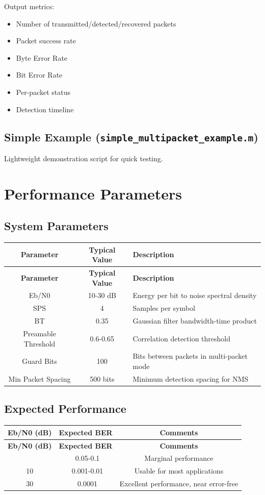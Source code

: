 \documentclass[12pt]{article}
\begin{document}
Output metrics:
\begin{itemize}
    \item Number of transmitted/detected/recovered packets
    \item Packet success rate
    \item Byte Error Rate
    \item Bit Error Rate
    \item Per-packet status
    \item Detection timeline
\end{itemize}

\subsection{Simple Example (\texttt{simple\_multipacket\_example.m})}
Lightweight demonstration script for quick testing.

\section{Performance Parameters}

\subsection{System Parameters}
\begin{longtable}{|c|c|p{8cm}|}
\hline
\textbf{Parameter} & \textbf{Typical Value} & \textbf{Description} \\
\hline
\endfirsthead
\hline
\textbf{Parameter} & \textbf{Typical Value} & \textbf{Description} \\
\hline
\endhead
\hline
\endfoot
\hline
Eb/N0 & 10-30 dB & Energy per bit to noise spectral density \\
\hline
SPS & 4 & Samples per symbol \\
\hline
BT & 0.35 & Gaussian filter bandwidth-time product \\
\hline
Preamable Threshold & 0.6-0.65 & Correlation detection threshold \\
\hline
Guard Bits & 100 & Bits between packets in multi-packet mode \\
\hline
Min Packet Spacing & 500 bits & Minimum detection spacing for NMS \\
\hline
\end{longtable}

\subsection{Expected Performance}
\begin{longtable}{|c|c|c|}
\hline
\textbf{Eb/N0 (dB)} & \textbf{Expected BER} & \textbf{Comments} \\
\hline
\endfirsthead
\hline
\textbf{Eb/N0 (dB)} & \textbf{Expected BER} & \textbf{Comments} \\
\hline
\endhead
\hline
\endfoot
\hline
3 & ~0.05-0.1 & Marginal performance \\
\hline
10 & ~0.001-0.01 & Usable for most applications \\
\hline
30 & ~0.0001 & Excellent performance, near error-free \\
\hline
\end{longtable}
\end{document}
